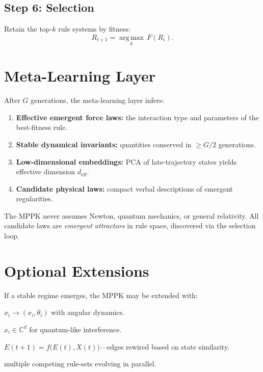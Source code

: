 \subsection{Step 6: Selection}

Retain the top-$k$ rule systems by fitness:
\[
  R_{t+1} = \operatorname*{arg\,max}_k\, F(R_i).
\]

\section{Meta-Learning Layer}
\label{sec:mppk-meta}

After $G$ generations, the meta-learning layer infers:

\begin{enumerate}[nosep]
  \item \textbf{Effective emergent force laws:} the interaction type
        and parameters of the best-fitness rule.
  \item \textbf{Stable dynamical invariants:} quantities conserved
        in $\ge G/2$ generations.
  \item \textbf{Low-dimensional embeddings:} PCA of late-trajectory
        states yields effective dimension $d_{\mathrm{eff}}$.
  \item \textbf{Candidate physical laws:} compact verbal descriptions
        of emergent regularities.
\end{enumerate}

\begin{remark}
The MPPK never assumes Newton, quantum mechanics, or general
relativity.  All candidate laws are \emph{emergent attractors}
in rule space, discovered via the selection loop.
\end{remark}

\section{Optional Extensions}
\label{sec:mppk-extensions}

If a stable regime emerges, the MPPK may be extended with:

\begin{description}[nosep]
  \item[Phase variables:]
    $x_i \to (x_i, \theta_i)$ with angular dynamics.
  \item[Complex-valued states:]
    $x_i \in \mathbb{C}^d$ for quantum-like interference.
  \item[Adaptive rewiring:]
    $E(t{+}1) = f\bigl(E(t), X(t)\bigr)$---edges rewired
    based on state similarity.
  \item[Multi-population co-evolution:]
    multiple competing rule-sets evolving in parallel.
\end{description}

